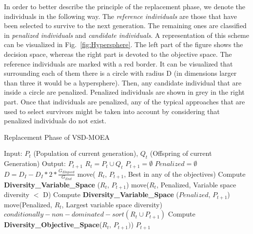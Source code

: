 In order to better describe the principle of the replacement phase, we denote the individuals in the following way.
%
The \textit{reference individuals} are those that have been selected to survive to the next generation. 
%
The remaining ones are classified in \textit{penalized individuals} and \textit{candidate individuals}.
%
A representation of this scheme can be visualized in Fig.~\ref{fig:Hypersphere}.
%
The left part of the figure shows the decision space, whereas the right part is devoted to the objective space. 
%
The reference individuals are marked with a red border.
%
It can be visualized that surrounding each of them there is a circle with radius D (in dimensions larger than three it would be a hypersphere).
%
Then, any candidate individual that are inside a circle are penalized.
%
Penalized individuals are shown in grey in the right part.
%
Once that individuals are penalized, any of the typical approaches that are used to select survivors might be taken into account
by considering that penalized individuals do not exist.


\begin{algorithm}[t]
  \scriptsize
	\caption{Replacement Phase of VSD-MOEA} 
\begin{algorithmic}[1]
\STATE Input: $P_t$ (Population of current generation), $Q_t$ (Offspring of current Generation)
    	\STATE Output: $P_{t+1}$
        \STATE $R_t = P_t \cup Q_t$
        \STATE $P_{t+1} = \emptyset$
        \STATE $Penalized = \emptyset$
				\STATE $D = D_I - D_I *2* \frac{G_{Elapsed}}{G_{End}}$ \label{DInicial} 			
		\STATE move( $R_t$,  $P_{t+1}$, Best in any of the objectives) 
        \label{alg:Extremos}
			\STATE Compute \textbf{Diversity\_Variable\_Space} ($R_t$, $P_{t+1}$) \label{alg:Calculo_Diversidad_Primero}
		\STATE move($R_t$, Penalized, Variable space diversity $ < $ D)  \label{alg:Calculo_Diversidad_Primero_Move}
				\STATE Compute \textbf{Diversity\_Variable\_Space} ($Penalized$, $P_{t+1}$) \label{alg:Penalized_Diversity}
				\STATE move(Penalized, $R_t$, Largest variable space diversity) \label{alg:Penalized_Diversity_move}
        \ENDIF
		\STATE $conditionally-non-dominated-sort(R_t \cup P_{t+1}) $\label{alg:rank}
		\STATE Compute \textbf{Diversity\_Objective\_Space}($R_t$, $P_{t+1})$) \label{alg:Diversity_Space}
        \ENDWHILE
    	\RETURN $P_{t+1}$
	\end{algorithmic}
\label{alg:Replacement_Phase}
\end{algorithm}


